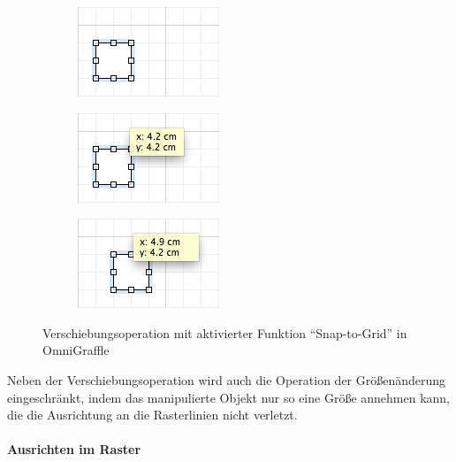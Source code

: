 \begin{figure}[hbt]
    \newcommand{\subfigurewidth}{0.33\textwidth}
    \newcommand{\graphicswidth}{0.95\linewidth}
    \begin{subfigure}{\subfigurewidth}
        \centering
        \includegraphics[width=\graphicswidth]{resources/omnigraffle-snap-to-grid-on-a}
        \caption{}
    \end{subfigure}
    \begin{subfigure}{\subfigurewidth}
        \centering
        \includegraphics[width=\graphicswidth]{resources/omnigraffle-snap-to-grid-on-b}
        \caption{}
    \end{subfigure}
    \begin{subfigure}{\subfigurewidth}
        \centering
        \includegraphics[width=\graphicswidth]{resources/omnigraffle-snap-to-grid-on-c}
        \caption{}
    \end{subfigure}
    \caption{Verschiebungsoperation mit aktivierter Funktion \enquote{Snap-to-Grid} in OmniGraffle}
    \label{fig:omnigraffle-snap-to-grid-on}
\end{figure}

Neben der Verschiebungsoperation wird auch die Operation der Größenänderung eingeschränkt, indem das manipulierte Objekt nur so eine Größe annehmen kann, die die Ausrichtung an die Rasterlinien nicht verletzt.

\paragraph{Ausrichten im Raster}

